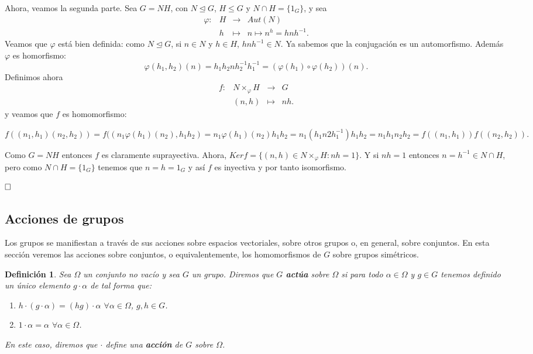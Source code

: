 \documentclass[12pt]{article}
\newtheorem{definition}[theorem]{Definición}
\begin{document}
Ahora, veamos la segunda parte. Sea $G=NH$, con $N \unlhd G$, $H\leq G$ y $N \cap H = \lbrace 1_{G} \rbrace$, y sea 
$$\begin{array}{rccl}
\varphi\colon &H & \longrightarrow & Aut(N)\\
&h& \longmapsto &n \longmapsto n^{h} = hnh^{-1}.
\end{array}
$$
Veamos que $\varphi$ está bien definida: como $N \unlhd G$, si $n \in N$ y $h \in H$, $hnh^{-1} \in N$. Ya sabemos que la conjugación es un automorfismo. Además $\varphi$ es homorfismo: $$\varphi(h_{1},h_{2})(n)=h_{1}h_{2}nh_{2}^{-1}h_{1}^{-1}=(\varphi(h_{1}) \circ \varphi(h_{2}))(n).$$
Definimos ahora $$\begin{array}{rccl}
f\colon &N \times _{\varphi} H & \longrightarrow & G\\
&(n,h)& \longmapsto &nh.
\end{array}
$$
y veamos que $f$ es homomorfismo: \begin{center}$f((n_{1},h_{1})(n_{2},h_{2}))=f((n_{1}\varphi(h_{1})(n_{2}),h_{1}h_{2})=n_{1}\varphi(h_{1})(n_{2})h_{1}h_{2}=n_{1}(h_{1}n2h_{1}^{-1})h_{1}h_{2}=n_{1}h_{1}n_{2}h_{2}=f((n_{1},h_{1}))f((n_{2},h_{2})).$\end{center}

Como $G=NH$ entonces $f$ es claramente suprayectiva. Ahora, $Ker f= \lbrace (n,h) \in N\times_{\varphi} H :nh=1 \rbrace$. Y si $nh=1$ entonces $n=h^{-1}\in N \cap H$, pero como $N \cap H = \lbrace 1_{G} \rbrace$ tenemos que $n=h=1_{G}$ y así $f$ es inyectiva y por tanto isomorfismo.

$\hfill \square$

\subsection{Acciones de grupos}

Los grupos se manifiestan a través de sus acciones sobre espacios vectoriales, sobre otros grupos o, en general, sobre conjuntos. En esta sección veremos las acciones sobre conjuntos, o equivalentemente, los homomorfismos de $G$ sobre grupos simétricos.

\begin{definition}Sea $\Omega$ un conjunto no vacío y sea $G$ un grupo. Diremos que $G$ \textbf{actúa} sobre $\Omega$ si para todo $\alpha \in \Omega$ y $g \in G$ tenemos definido un único elemento $g \cdot \alpha$ de tal forma que:
\begin{enumerate}
\item $h \cdot (g \cdot \alpha)=(hg) \cdot \alpha$ $\forall \alpha \in \Omega$, $g,h \in G$.
\item $1 \cdot \alpha =\alpha$ $\forall \alpha \in \Omega$.
\end{enumerate}

En este caso, diremos que $\cdot$ define una \textbf{acción} de $G$ sobre $\Omega$.
\end{definition}
\end{document}
